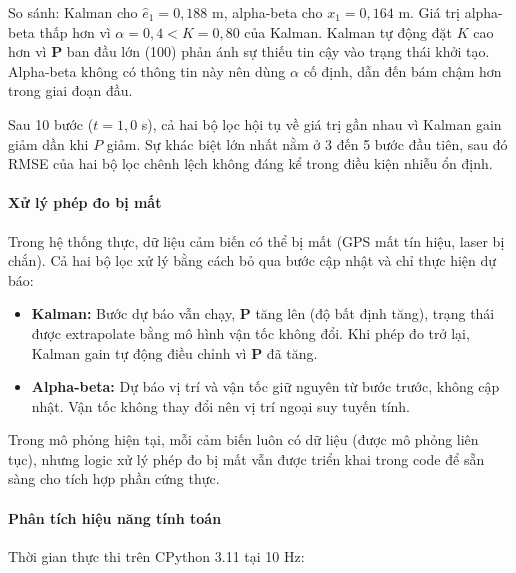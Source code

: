 So sánh: Kalman cho $\hat{e}_1 = 0{,}188$ m, alpha-beta cho $x_1 = 0{,}164$ m. Giá trị alpha-beta thấp hơn vì $\alpha = 0{,}4 < K = 0{,}80$ của Kalman. Kalman tự động đặt $K$ cao hơn vì $\mathbf{P}$ ban đầu lớn (100) phản ánh sự thiếu tin cậy vào trạng thái khởi tạo. Alpha-beta không có thông tin này nên dùng $\alpha$ cố định, dẫn đến bám chậm hơn trong giai đoạn đầu.

Sau 10 bước ($t = 1{,}0$ s), cả hai bộ lọc hội tụ về giá trị gần nhau vì Kalman gain giảm dần khi $P$ giảm. Sự khác biệt lớn nhất nằm ở 3 đến 5 bước đầu tiên, sau đó RMSE của hai bộ lọc chênh lệch không đáng kể trong điều kiện nhiễu ổn định.

\paragraph{Xử lý phép đo bị mất\\} Trong hệ thống thực, dữ liệu cảm biến có thể bị mất (GPS mất tín hiệu, laser bị chắn). Cả hai bộ lọc xử lý bằng cách bỏ qua bước cập nhật và chỉ thực hiện dự báo:

\begin{itemize}
    \item \textbf{Kalman:} Bước dự báo vẫn chạy, $\mathbf{P}$ tăng lên (độ bất định tăng), trạng thái được extrapolate bằng mô hình vận tốc không đổi. Khi phép đo trở lại, Kalman gain tự động điều chỉnh vì $\mathbf{P}$ đã tăng.
    \item \textbf{Alpha-beta:} Dự báo vị trí và vận tốc giữ nguyên từ bước trước, không cập nhật. Vận tốc không thay đổi nên vị trí ngoại suy tuyến tính.
\end{itemize}

Trong mô phỏng hiện tại, mỗi cảm biến luôn có dữ liệu (được mô phỏng liên tục), nhưng logic xử lý phép đo bị mất vẫn được triển khai trong code để sẵn sàng cho tích hợp phần cứng thực.

\paragraph{Phân tích hiệu năng tính toán\\} Thời gian thực thi trên CPython 3.11 tại 10 Hz:

\begin{table}[H]
\centering
\caption{Thời gian thực thi mỗi bước lọc}
\label{tab:filter-timing}
\end{table}

